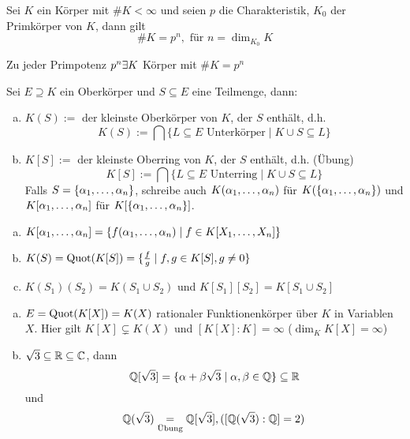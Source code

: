 \documentclass[a4paper]{report}
\begin{document}
\begin{prop}[Übung]
  Sei $K$ ein Körper mit $\#K < \infty$ und seien $p$ die Charakteristik, $K_{0}$ der Primkörper von $K$, dann gilt
  \[\#K= p^{n}, \text{ für } n = \dim_{K_{0}}K\]
\end{prop}

\begin{bem*}
Zu jeder Primpotenz $p^{n} \ex K$ Körper mit $\#K = p^{n}$
\end{bem*}

\begin{defi}
  Sei $E \supseteq K$ ein Oberkörper und $S \subseteq E$ eine Teilmenge, dann:
  \begin{enumerate}[(a)]
          \item $K(S):=$ der kleinste Oberkörper von $K$, der $S$ enthält, d.h.
          \[K(S):=\bigcap \{L \subseteq E \text{ Unterkörper} \mid K \cup S \subseteq L \}\]
    \item $K[S]:=$ der kleinste Oberring von $K$, der $S$ enthält, d.h. (Übung)
          \[K[S]:=\bigcap \{L \subseteq E \text{ Unterring} \mid K \cup S \subseteq L \}\]
          Falls $S = \{\a_{1}, \ldots, \a_{n}\}$, schreibe auch $K(\a_{1}, \ldots, \a_{n})$ für $K(\{\a_{1}, \ldots, \a_{n}\})$ und $K[\a_{1}, \ldots, \a_{n}]$ für $K[\{\a_{1}, \ldots, \a_{n}\}]$.
  \end{enumerate}
\end{defi}

\begin{bem*}\item
  \begin{enumerate}[(a)]
    \item $K[\a_{1}, \ldots, \a_{n}] = \{f(\a_{1}, \ldots, \a_{n}) \mid f \in K[X_{1}, \ldots, X_{n}]\}$
    \item $K(S) = \Quot (K[S]) = \{\frac fg \mid f, g \in K[S], g \ne 0\}$
    \item $K(S_{1})(S_{2}) = K(S_{1} \cup S_{2})$ und $K[S_{1}][S_{2}] = K[S_{1} \cup S_{2}]$
  \end{enumerate}
\end{bem*}
\begin{bsp*}\item
\begin{enumerate}[(a)]
  \item $E = \Quot(K[X]) = K(X)$ rationaler Funktionenkörper über $K$ in Variablen $X$. Hier gilt $K[X] \subsetneq K(X)$ und $[K[X] : K] = \infty$ ($\dim_{K}K[X] = \infty$)
  \item $\sqrt 3 \subseteq \R \subseteq \C$, dann
        \[\Q[\sqrt 3] = \{\a + \b \sqrt 3 \mid \a, \b \in \Q\} \subseteq \R\]
        und
        \[\Q(\sqrt 3) \ueb = \Q[\sqrt 3], ([\Q(\sqrt 3) : \Q] = 2)\]
\end{enumerate}

\end{bsp*}
\end{document}
